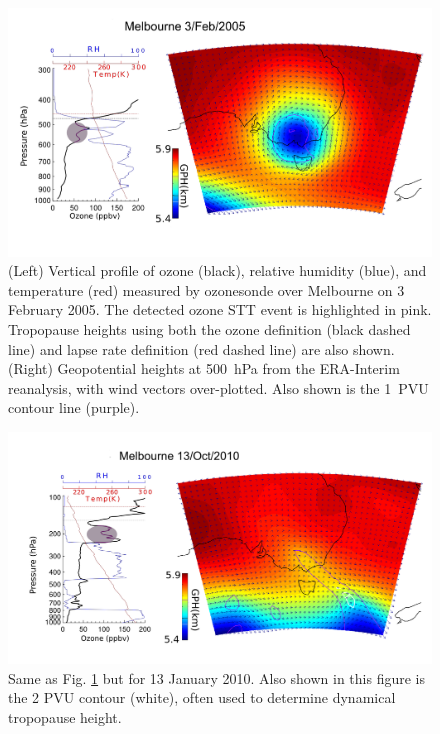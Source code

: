     \begin{figure}[t]
      \includegraphics[width=14.0cm]{../figures/Melbourne20050203.png}
      \caption{(Left) Vertical profile of ozone (black), relative humidity (blue), and temperature (red) measured by ozonesonde over Melbourne on 3 February 2005.
      The detected ozone STT event is highlighted in pink.
      Tropopause heights using both the ozone definition (black dashed line) and lapse rate definition (red dashed line) are also shown.
      (Right) Geopotential heights at 500~hPa from the ERA-Interim reanalysis, with wind vectors over-plotted.
      Also shown is the 1~PVU contour line (purple).}
      \label{fig:Melbourne20050203}
    \end{figure}
    
    \begin{figure}[t]
      \includegraphics[width=14.0cm]{../figures/Melbourne20100113.png}
      \caption{Same as Fig. \ref{fig:Melbourne20050203} but for 13 January 2010.
	Also shown in this figure is the 2 PVU contour (white), often used to determine dynamical tropopause height.}
      \label{fig:Melbourne20100113}
    \end{figure}
    
